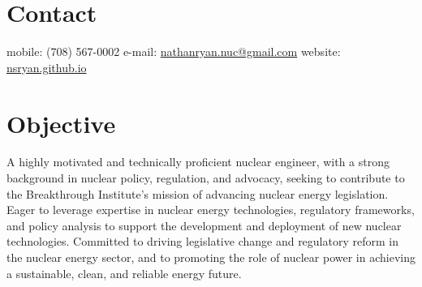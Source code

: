 \documentclass[margin,line]{resume}
\begin{document}
\begin{resume}

%


    \section{\mysidestyle Contact}
    mobile: (708) 567-0002 \hfill e-mail: \href{mailto:nathanryan.nuc@gmail.com}{nathanryan.nuc@gmail.com} \hfill website: \href{https://nsryan.github.io}{nsryan.github.io} \vspace{0mm}\\\vspace{1mm}%

    \vspace{-6mm}
    \section{\mysidestyle Objective}

        A highly motivated and technically proficient nuclear engineer, with a strong background in nuclear policy, regulation, and advocacy, seeking to contribute to the Breakthrough Institute’s mission of advancing nuclear energy legislation. Eager to leverage expertise in nuclear energy technologies, regulatory frameworks, and policy analysis to support the development and deployment of new nuclear technologies. Committed to driving legislative change and regulatory reform in the nuclear energy sector, and to promoting the role of nuclear power in achieving a sustainable, clean, and reliable energy future.

\end{resume}
\end{document}
